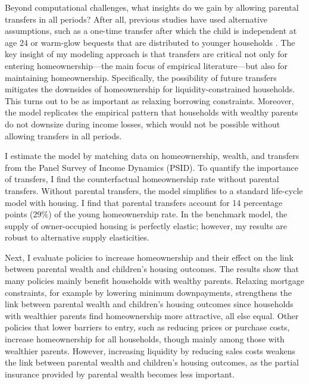 \documentclass[12pt]{article}
\begin{document}
Beyond computational challenges, what insights do we gain by allowing parental transfers in all periods? After all, previous studies have used alternative assumptions, such as a one-time transfer after which the child is independent at age 24 \citep[e.g.,][]{Lee2019} or warm-glow bequests that are distributed to younger households \citep[e.g.,][]{aliprantis2022dynamics}. The key insight of my modeling approach is that transfers are critical not only for entering homeownership---the main focus of empirical literature---but also for maintaining homeownership. Specifically, the possibility of future transfers mitigates the downsides of homeownership for liquidity-constrained households. This turns out to be as important as relaxing borrowing constraints. Moreover, the model replicates the empirical pattern that households with wealthy parents do not downsize during income losses, which would not be possible without allowing transfers in all periods. 

I estimate the model by matching data on homeownership, wealth, and transfers from the Panel Survey of Income Dynamics (PSID). To quantify the importance of  transfers, I find the counterfactual homeownership rate without parental transfers. Without parental transfers, the model simplifies to a standard life-cycle model with housing. I find that parental transfers account for 14 percentage points (29\%) of the young homeownership rate. In the benchmark model, the supply of owner-occupied housing is perfectly elastic; however, my results are robust to alternative supply elasticities. 

Next, I evaluate policies to increase homeownership and their effect on the link between parental wealth and children's housing outcomes. The results show that many policies mainly benefit households with wealthy parents. Relaxing mortgage constraints, for example by lowering minimum downpayments, strengthens the link between parental wealth and children's housing outcomes since households with wealthier parents find homeownership more attractive, all else equal. Other policies that lower barriers to entry, such as reducing prices or purchase costs, increase homeownership for all households, though mainly among those with wealthier parents. However, increasing liquidity by reducing sales costs weakens the link between parental wealth and children’s housing outcomes, as the partial insurance provided by parental wealth becomes less important.
\end{document}
